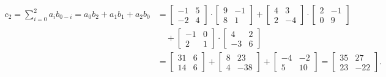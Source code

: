 \begin{align*}
 c_2 = \sum_{i = 0}^2 a_i b_{0 - i} = a_0b_2+a_1b_1+a_2b_0&= \begin{bmatrix} 
-1 & 5 \\
-2 & 4
\end{bmatrix} \cdot \begin{bmatrix} 
9 & -1\\
8 & 1
\end{bmatrix}+ \begin{bmatrix} 
4 & 3\\
2 & -4
\end{bmatrix} \cdot\begin{bmatrix}
2 & -1\\
0 & 9
\end{bmatrix}\\
&\quad +\begin{bmatrix}
-1 & 0\\
2 & 1
\end{bmatrix}\cdot \begin{bmatrix}
4 & 2\\
-3 & 6
\end{bmatrix}\\
&=\begin{bmatrix}
31 & 6\\
14 & 6
\end{bmatrix}+\begin{bmatrix}
8 & 23\\
4 & -38
\end{bmatrix}+\begin{bmatrix}
-4 & -2\\
5 & 10
\end{bmatrix}=\begin{bmatrix}
35 & 27\\
23 & -22
\end{bmatrix}.
\end{align*}

